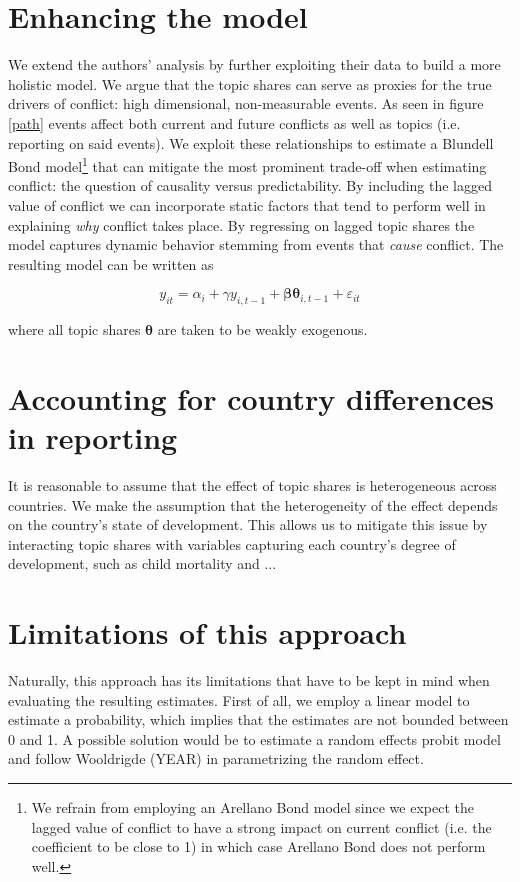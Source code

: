 \section{Enhancing the model}
We extend the authors' analysis by further exploiting their data to build a more holistic model.
We argue that the topic shares can serve as proxies for the true drivers of conflict: high dimensional, non-measurable events.
As seen in figure \ref{path} events affect both current and future conflicts as well as topics (i.e. reporting on said events).
We exploit these relationships to estimate a Blundell Bond model\footnote{We refrain from employing an Arellano Bond model since we expect the lagged value of conflict to have a strong impact on current conflict (i.e. the coefficient to be close to 1) in which case Arellano Bond does not perform well.} that can mitigate the most prominent trade-off when estimating conflict: the question of causality versus predictability.
By including the lagged value of conflict we can incorporate static factors that tend to perform well in explaining \textit{why} conflict takes place.
By regressing on lagged topic shares the model captures dynamic behavior stemming from events that \textit{cause} conflict.
The resulting model can be written as

\begin{equation}
    y_{it} = \alpha_i + \gamma y_{i, t-1} + \mathbf{\beta}\mathbf{\theta}_{i, t-1} + \varepsilon_{it}
\end{equation}

where all topic shares $\mathbf{\theta}$ are taken to be weakly exogenous.

\section{Accounting for country differences in reporting}
It is reasonable to assume that the effect of topic shares is heterogeneous across countries.
We make the assumption that the heterogeneity of the effect depends on the country's state of development.
This allows us to mitigate this issue by interacting topic shares with variables capturing each country's degree of development, such as child mortality and ...

\section{Limitations of this approach}
Naturally, this approach has its limitations that have to be kept in mind when evaluating the resulting estimates.
First of all, we employ a linear model to estimate a probability, which implies that the estimates are not bounded between 0 and 1.
A possible solution would be to estimate a random effects probit model and follow Wooldrigde (YEAR) in parametrizing the random effect.

